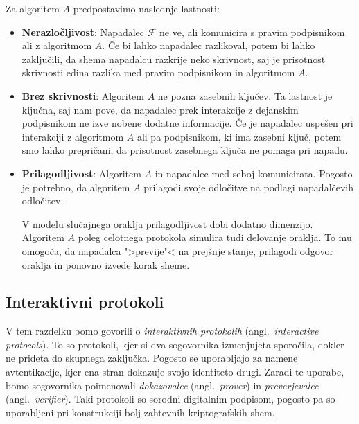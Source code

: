 Za algoritem $A$ predpostavimo naslednje lastnosti:
\begin{itemize}
    \item \textbf{Nerazločljivost}: Napadalec $\mathcal{F}$ ne ve, ali komunicira s pravim podpisnikom
        ali z algoritmom $A$. Če bi lahko napadalec razlikoval, potem bi lahko zaključili,
        da shema napadalcu razkrije neko skrivnost, saj je prisotnost skrivnosti edina razlika med
        pravim podpisnikom in algoritmom $A$.
    \item \textbf{Brez skrivnosti}: Algoritem $A$ ne pozna zasebnih ključev. Ta lastnost
        je ključna, saj nam pove, da napadalec prek interakcije z dejanskim podpisnikom ne izve
        nobene dodatne informacije. Če je napadalec uspešen pri interakciji z algoritmom $A$
        ali pa podpisnikom, ki ima zasebni ključ, potem smo lahko prepričani, da prisotnost zasebnega
        ključa ne pomaga pri napadu.
    \item \textbf{Prilagodljivost}: Algoritem $A$ in napadalec med seboj komunicirata.
        Pogosto je potrebno, da algoritem $A$ prilagodi svoje odločitve na podlagi
        napadalčevih odločitev.

        V modelu slučajnega oraklja prilagodljivost dobi dodatno dimenzijo. Algoritem $A$
        poleg celotnega protokola simulira tudi delovanje oraklja. To mu omogoča, da napadalca ">previje"<
        na prejšnje stanje, prilagodi odgovor oraklja in ponovno izvede korak sheme.
\end{itemize}

\subsection{Interaktivni protokoli}
V tem razdelku bomo govorili o \textit{interaktivnih protokolih} (angl.\ \textit{interactive protocols}).
To so protokoli, kjer si dva sogovornika izmenjujeta sporočila, dokler ne prideta do skupnega zaključka.
Pogosto se uporabljajo za namene avtentikacije, kjer ena stran dokazuje svojo identiteto drugi.
Zaradi te uporabe, bomo sogovornika poimenovali \textit{dokazovalec} (angl.\ \textit{prover}) in
\textit{preverjevalec} (angl.\ \textit{verifier}). Taki protokoli so sorodni digitalnim podpisom,
pogosto pa so uporabljeni pri konstrukciji bolj zahtevnih kriptografskih shem.

